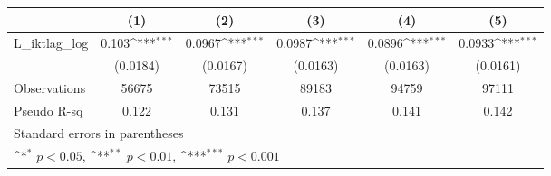 {
\def\sym#1{\ifmmode^{#1}\else\(^{#1}\)\fi}
\begin{tabular}{l*{5}{c}}
\hline\hline
                &\multicolumn{1}{c}{(1)}         &\multicolumn{1}{c}{(2)}         &\multicolumn{1}{c}{(3)}         &\multicolumn{1}{c}{(4)}         &\multicolumn{1}{c}{(5)}         \\
\hline
L\_iktlag\_log    &    0.103\sym{***}&   0.0967\sym{***}&   0.0987\sym{***}&   0.0896\sym{***}&   0.0933\sym{***}\\
                & (0.0184)         & (0.0167)         & (0.0163)         & (0.0163)         & (0.0161)         \\
\hline
Observations    &    56675         &    73515         &    89183         &    94759         &    97111         \\
Pseudo R-sq     &    0.122         &    0.131         &    0.137         &    0.141         &    0.142         \\
\hline\hline
\multicolumn{6}{l}{\footnotesize Standard errors in parentheses}\\
\multicolumn{6}{l}{\footnotesize \sym{*} \(p<0.05\), \sym{**} \(p<0.01\), \sym{***} \(p<0.001\)}\\
\end{tabular}
}
